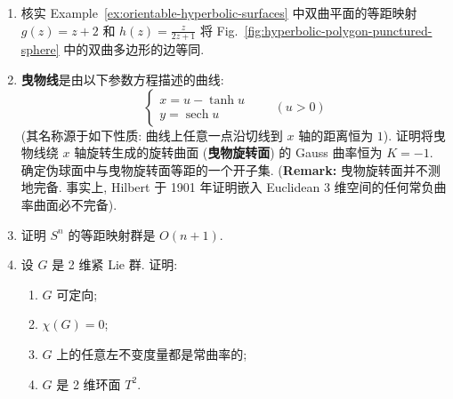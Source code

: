 \begin{RiemannExercise}
\begin{enumerate}[label=(\arabic*),ref=\arabic*,leftmargin=*]
\begin{enumerate}[label=(\alph*),leftmargin=*]
\item 公式
\[
  \begin{pmatrix}a&b\\c&d\end{pmatrix}\cdot z:=\frac{az+b}{cz+d}\qquad(ad-bc=1)
\]
定义了 $\mathit{PSL}(2,\mathbb{R}):=\mathit{SL}(2,\mathbb{R})/\{\pm\operatorname{id}\}$ 在 $H^2$ 上通过保持定向的等距映射给出的作用;
\item 对任意两条以弧长为参数的测地线 $c_1,c_2:\mathbb{R}\to H^2$, 存在 $g\in\mathit{PSL}(2,\mathbb{R})$, 使得对所有 $s\in\mathbb{R}$ 有 $c_1(s)=g\cdot c_2(s)$;
\item 给定满足 $d(z_1,z_2)=d(z_3,z_4)$ 的 $z_1,z_2,z_3,z_4\in H^2$, 存在 $g\in\mathit{PSL}(2,\mathbb{R})$, 使得 $g\cdot z_1=z_3$ 且 $g\cdot z_2=z_4$;
\item 若 $H^2$ 的一个保持定向的等距映射有两个不动点, 则它必为恒等映射. 由此推出, 所有保持定向的等距映射均为 $f(z)=g\cdot z$ 的形式, 其中 $g\in\mathit{PSL}(2,\mathbb{R})$.
\end{enumerate}
\item\label{ex:identifications-on-hyperbolic-polygon} 核实 Example~\ref{ex:orientable-hyperbolic-surfaces} 中双曲平面的等距映射 $g(z)=z+2$ 和 $h(z)=\frac{z}{2z+1}$ 将 Fig.~\ref{fig:hyperbolic-polygon-punctured-sphere} 中的双曲多边形的边等同.
\item\label{ex:tractrix-and-tractroid} \textbf{曳物线}是由以下参数方程描述的曲线:
\[
  \begin{cases}
    x=u-\tanh u\\
    y=\operatorname{sech}u
  \end{cases}
  \qquad(u>0)
\]
(其名称源于如下性质: 曲线上任意一点沿切线到 $x$ 轴的距离恒为 $1$). 证明将曳物线绕 $x$ 轴旋转生成的旋转曲面 (\textbf{曳物旋转面}) 的 Gauss 曲率恒为 $K=-1$. 确定伪球面中与曳物旋转面等距的一个开子集.
{\small (\textbf{Remark:} 曳物旋转面并不测地完备. 事实上, Hilbert 于 1901 年证明嵌入 Euclidean 3 维空间的任何常负曲率曲面必不完备).}
\item\label{ex:isometry-group-of-sphere} 证明 $S^n$ 的等距映射群是 $O(n+1)$.
\item\label{ex:compact-two-dimensional-lie-groups} 设 $G$ 是 2 维紧 Lie 群. 证明:
\begin{enumerate}[label=(\alph*),leftmargin=*]
\item $G$ 可定向;
\item $\chi(G)=0$;
\item $G$ 上的任意左不变度量都是常曲率的;
\item $G$ 是 2 维环面 $T^2$.
\end{enumerate}
\end{enumerate}
\end{RiemannExercise}
